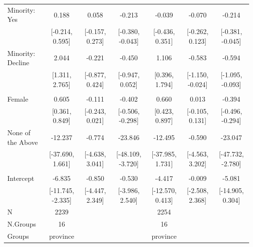 \documentclass[
  10,
  letterpaper,
  DIV=11,
  numbers=noendperiod]{scrartcl}
\begin{document}
\begin{table}
\begin{tabular}[t]{lcccccc}
\hspace{1em}Minority: Yes & 0.188 & 0.058 & -0.213 & -0.039 & -0.070 & -0.214\\
\hspace{1em} & {}[-0.214, 0.595] & {}[-0.157, 0.273] & {}[-0.380, -0.043] & {}[-0.436, 0.351] & {}[-0.262, 0.123] & {}[-0.381, -0.045]\\
\hspace{1em}Minority: Decline & 2.044 & -0.221 & -0.450 & 1.106 & -0.583 & -0.594\\
\hspace{1em} & {}[1.311, 2.765] & {}[-0.877, 0.424] & {}[-0.947, 0.052] & {}[0.396, 1.794] & {}[-1.150, -0.024] & {}[-1.095, -0.093]\\
\addlinespace[0.3em]
\multicolumn{7}{l}{\cellcolor[HTML]{3498DB}{\textbf{Gender}}}\\
\hspace{1em}Female & 0.605 & -0.111 & -0.402 & 0.660 & 0.013 & -0.394\\
\hspace{1em} & {}[0.361, 0.849] & {}[-0.243, 0.021] & {}[-0.506, -0.298] & {}[0.423, 0.897] & {}[-0.105, 0.131] & {}[-0.496, -0.294]\\
\hspace{1em}None of the Above & -12.237 & -0.774 & -23.846 & -12.495 & -0.590 & -23.047\\
\hspace{1em} & {}[-37.690, 1.661] & {}[-4.638, 3.041] & {}[-48.109, -3.720] & {}[-37.985, 1.731] & {}[-4.563, 3.202] & {}[-47.732, -2.780]\\
\addlinespace[0.3em]
\multicolumn{7}{l}{\cellcolor[HTML]{3498DB}{\textbf{Intercept}}}\\
\hspace{1em}Intercept & -6.835 & -0.850 & -0.530 & -4.417 & -0.009 & -5.081\\
\hspace{1em} & {}[-11.745, -2.335] & {}[-4.447, 2.349] & {}[-3.986, 2.540] & {}[-12.570, 0.413] & {}[-2.508, 2.368] & {}[-14.905, 0.304]\\
\midrule
N & 2239 &  &  & 2254 &  & \\
N.Groups & 16 &  &  & 16 &  & \\
Groups & province &  &  & province &  & \\
\bottomrule
\end{tabular}
\end{table}
\end{document}
